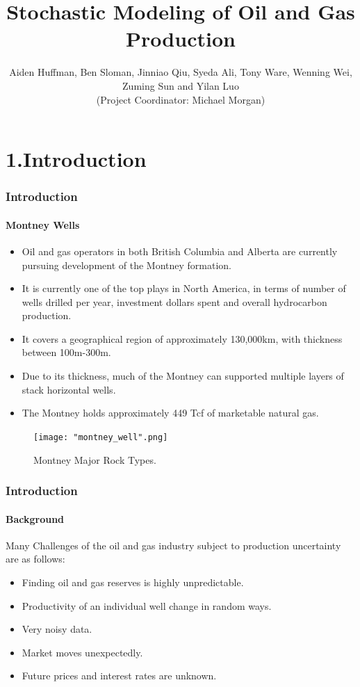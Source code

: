 \documentclass[11pt]{beamer}
\author{Aiden Huffman, Ben Sloman, Jinniao Qiu, Syeda Ali, Tony Ware, Wenning Wei, Zuming Sun and Yilan Luo\\
 (Project Coordinator: Michael Morgan)
}
\title{Stochastic Modeling of Oil and Gas Production
}
\begin{document}
\upshape
\maketitle
\begin{frame}
	\tableofcontents
\end{frame}


\section{1.Introduction}
	\begin{frame}
    	\frametitle{Introduction}
        \framesubtitle{Montney Wells}
        \justifying
       \begin{itemize}
            \item Oil and gas operators in both British Columbia and Alberta are currently pursuing development of the Montney formation.
            \item It is currently one of the top plays in North America, in terms of number of wells drilled per year, investment dollars spent and overall hydrocarbon production.
            \item It covers a geographical region of approximately 130,000km, with thickness between 100m-300m.
            \item Due to its thickness, much of the Montney can supported multiple layers of stack horizontal wells.
            \item The Montney holds approximately 449 Tcf of marketable natural gas.
         \end{itemize}
     \end{frame}

\begin{frame}
\begin{figure}
\begin{center}
\texttt{[image: "montney\_well".png]} 
\caption{Montney Major Rock Types.}
\label{smooth}
\end{center}
\end{figure}
	\end{frame}	
	
\begin{frame}
	\frametitle{Introduction}
    \framesubtitle{Background}
Many Challenges of the oil and gas industry subject to production uncertainty are as follows:
\begin{itemize}
\item Finding oil and gas reserves is highly unpredictable.
\item Productivity of an individual well change in random ways.
\item Very noisy data.
\item Market moves unexpectedly.
\item Future prices and interest rates are unknown.
\end{itemize}
\end{frame}
\end{document}
